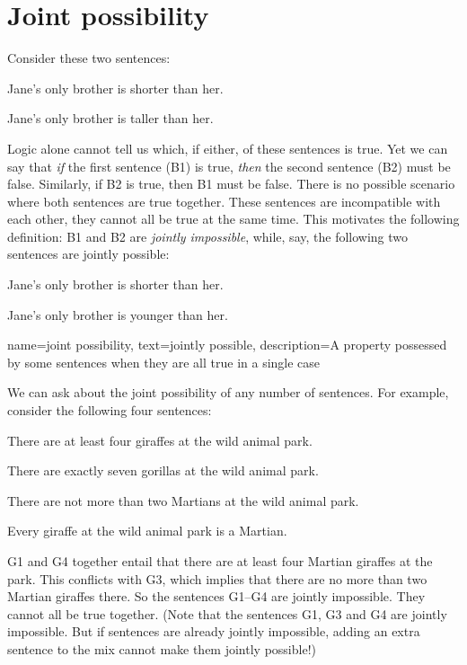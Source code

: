 
\section{Joint possibility}

Consider these two sentences:
	\begin{compactlist}
		\item[B1.] Jane's only brother is shorter than her.
		\item[B2.] Jane's only brother is taller than her.
	\end{compactlist}
Logic alone cannot tell us which, if either, of these sentences is true. Yet we can say that \emph{if} the first sentence (B1) is true, \emph{then} the second sentence (B2) must be false. Similarly, if B2 is true, then B1 must be false. There is no possible scenario where both sentences are true together. These sentences are incompatible with each other, they cannot all be true at the same time. This motivates the following definition:
B1 and B2 are \emph{jointly impossible}, while, say, the following two sentences are jointly possible:
	\begin{compactlist}
		\item[B1.] Jane's only brother is shorter than her.
		\item[B3.] Jane's only brother is younger than her.
	\end{compactlist}

{
name=joint possibility,
text={jointly possible},
description={A property possessed by some sentences when they are all true in a single case}
}

We can ask about the joint possibility of any number of sentences. For example, consider the following four sentences:
	\begin{compactlist}	
		\item[G1.] \label{MartianGiraffes} There are at least four giraffes at the wild animal park.
		\item[G2.] There are exactly seven gorillas at the wild animal park.
		\item[G3.] There are not more than two Martians at the wild animal park.
		\item[G4.] Every giraffe at the wild animal park is a Martian.
	\end{compactlist}
G1 and G4 together entail that there are at least four Martian
giraffes at the park. This conflicts with G3, which implies that there
are no more than two Martian giraffes there. So the sentences G1--G4
are jointly impossible. They cannot all be true together. (Note that
the sentences G1, G3 and G4 are jointly impossible. But if sentences
are already jointly impossible, adding an extra sentence to the mix
cannot make them jointly possible!)

